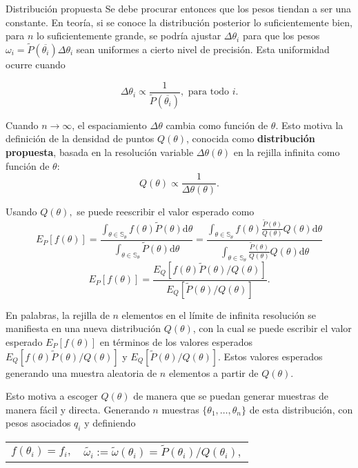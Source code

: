 \documentclass{beamer}
\begin{document}
	\begin{frame}[allowframebreaks]{Distribución propuesta}
	Se debe procurar entonces que los pesos tiendan a ser una constante. En teoría, si se conoce la distribución posterior lo suficientemente bien, para $n$ lo suficientemente grande, se podría ajustar $\Delta\theta_i$ para que los pesos $\omega_i=\tilde{P}(\overline{\theta_i})\Delta\theta_i$ sean uniformes a cierto nivel de precisión. Esta uniformidad ocurre cuando
	
	$$\Delta\theta_i \propto \frac{1}{\tilde{P}(\overline{\theta_i})}, \text{ para todo } i.$$
	
	Cuando $n\rightarrow \infty$, el espaciamiento $\Delta\theta$ cambia como función de $\theta$. Esto motiva la definición de la densidad de puntos $Q(\theta)$, conocida como \textbf{distribución propuesta}, basada en la resolución variable $\Delta\theta(\theta)$ en la rejilla infinita como función de $\theta$:
	$$Q(\theta) \propto \frac{1}{\Delta\theta(\theta)}.$$
	
	Usando $Q(\theta),$ se puede reescribir el valor esperado como
	$$E_P[f(\theta)]=\frac{\int_{\theta\in\mathbb{S}_\theta} f(\theta) \tilde{P}(\theta)\mathrm{d}\theta}{\int_{\theta\in\mathbb{S}_\theta} \tilde{P}(\theta)\mathrm{d}\theta}=\frac{\int_{\theta\in\mathbb{S}_\theta} f(\theta) \frac{\tilde{P}(\theta)}{Q(\theta)} Q(\theta)\mathrm{d}\theta}{\int_{\theta\in\mathbb{S}_\theta} \frac{\tilde{P}(\theta)}{Q(\theta)} Q(\theta)\mathrm{d}\theta}$$$$E_P[f(\theta)]=\frac{E_Q[f(\theta)\tilde{P}(\theta)/Q(\theta)]}{E_Q[\tilde{P}(\theta)/Q(\theta)]}.$$
	
	En palabras, la rejilla de $n$ elementos en el límite de infinita resolución se manifiesta en una nueva distribución $Q(\theta)$, con la cual se puede escribir el valor esperado $E_P[f(\theta)]$ en términos de los valores esperados $E_Q[f(\theta)\tilde{P}(\theta)/Q(\theta)]$ y $E_Q[\tilde{P}(\theta)/Q(\theta)]$. Estos valores esperados generando una muestra aleatoria de $n$ elementos a partir de $Q(\theta)$.
	
	\vspace{5cm}
	
	Esto motiva a escoger $Q(\theta)$ de manera que se puedan generar muestras de manera fácil y directa. Generando $n$ muestras $\{\theta_1,\dots,\theta_n\}$ de esta distribución, con pesos asociados $q_i$ y definiendo
	\begin{center}
	\begin{tabular}{cc}
	$f(\theta_i)=f_i,$& $\tilde{\omega_i}:=\tilde{\omega}(\theta_i)=\tilde{P}(\theta_i)/Q(\theta_i),$
	\end{tabular}
	\end{center}
	

\end{frame}
\end{document}

